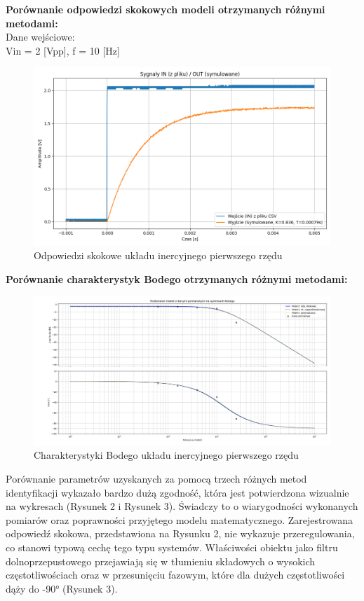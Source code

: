 \documentclass[12pt,a4paper]{article}
\begin{document}
	\textbf{Porównanie odpowiedzi skokowych modeli otrzymanych różnymi metodami:} \\
	Dane wejściowe: \\
	Vin = 2 [Vpp], f = 10 [Hz]
	
	\begin{figure}[H]
		\centering
		\includegraphics[width=1\linewidth]{zdjecia/OdpSkokowa1.png}
		\caption{Odpowiedzi skokowe układu inercyjnego pierwszego rzędu}
		\label{fig:OdpSkokowa1}
	\end{figure}
	
	\textbf{Porównanie charakterystyk Bodego otrzymanych różnymi metodami:}
	\begin{figure}[H]
		\centering
		\includegraphics[width=1\linewidth]{zdjecia/Body1.png}
		\caption{Charakterystyki Bodego układu inercyjnego pierwszego rzędu}
		\label{fig:Body1}
	\end{figure}
	
	Porównanie parametrów uzyskanych za pomocą trzech różnych metod identyfikacji wykazało bardzo dużą zgodność, która jest potwierdzona wizualnie na wykresach (Rysunek 2 i Rysunek 3). Świadczy to o wiarygodności wykonanych pomiarów oraz poprawności przyjętego modelu matematycznego. Zarejestrowana odpowiedź skokowa, przedstawiona na Rysunku 2, nie wykazuje przeregulowania, co stanowi typową cechę tego typu systemów. Właściwości obiektu jako filtru dolnoprzepustowego przejawiają się w tłumieniu składowych o wysokich częstotliwościach oraz w przesunięciu fazowym, które dla dużych częstotliwości dąży do -90° (Rysunek 3).
	
\end{document}
